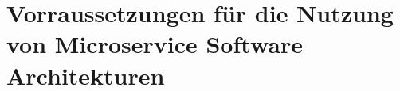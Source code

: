 \newpage
\section{Vorraussetzungen für die Nutzung von Microservice Software Architekturen} \label{wann-msa}


